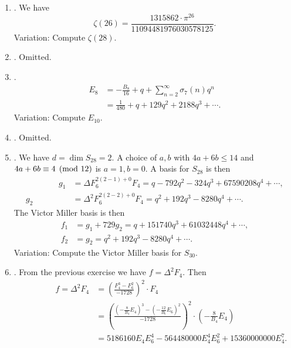 \begin{enumerate}
\item {}.
We have
$$\zeta(26) = \frac{1315862 \cdot \pi^{26}}{11094481976030578125}.$$
Variation: Compute $\zeta(28)$.

\item {}. Omitted.

\item {}.
\begin{align*}
 E_8 &=  -\frac{B_8}{16} + q + \sum_{n=2}^{\infty} \sigma_7(n) q^n\\
     &= \frac{1}{480} + q + 129q^{2} + 2188q^{3} + \cdots.
   \end{align*}
Variation: Compute $E_{10}$.


\item {}. Omitted.

\item  {}.
We have $d=\dim S_{28} = 2$.  A choice of
$a,b$ with $4a+6b\leq 14$ and $4a+6b \equiv 4\pmod{12}$
is $a=1, b=0$.
A basis for $S_{28}$ is then 
\begin{align*}
\qquad \qquad g_1 &=  \Delta F_6^{2(2-1) + 0} F_4 =q - 792q^{2} - 324q^{3} + 67590208q^{4} + \cdots,\\
g_2 &=  \Delta^2 F_6^{2(2-2)+0} F_4 = q^{2} + 192q^{3} - 8280q^{4} + \cdots.
\end{align*}
The Victor Miller basis is then
\begin{align*}
  f_1 &= g_1 +729g_2 = q + 151740q^{3} + 61032448q^{4} + \cdots, \\
  f_2 &= g_2 = q^{2} + 192q^{3} - 8280q^{4} + \cdots.
\end{align*}
Variation: Compute the Victor Miller basis for $S_{30}$.

\item {}.
From the previous exercise we have $f = \Delta^2 F_4$.
Then
\begin{align*}
\qquad \qquad f = \Delta^2 F_4 &= \left(\frac{F_4^3 - F_6^2}{-1728}\right)^2 \cdot F_4 \\
      &= \left(\frac{\left(-\frac{8}{B_4} E_4\right)^3 - 
              \left(-\frac{12}{B_6} E_6\right)^2}{-1728}\right)^2
           \cdot \left(-\frac{8}{B_4} E_4\right) \\
      &= 5186160 E_4E_6^{4} - 564480000 E_4^{4}E_6^{2} + 15360000000 E_4^{7}.
\end{align*}



\end{enumerate}
